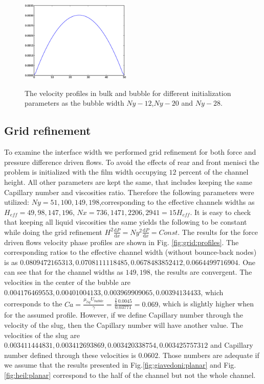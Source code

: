 \documentclass{article}
\begin{document}
\begin{figure}
  \hfill
  \includegraphics[width=0.47\textwidth]{Figures/vel_bulk_force_width_14.eps}\\
  \caption{The velocity profiles in bulk and bubble for different initialization
  parameters as the
  bubble width $Ny-12$,$Ny-20$ and $Ny-28$.
  \label{fig:velocity:profiles:different:widths:force}}
  \end{figure}


\subsection{Grid refinement}
To examine the interface width we performed grid refinement for both force and
pressure difference driven flows. To avoid the effects of rear and front
menisci the problem is initialized with the film width occupying $12$ percent
of the channel height. All other parameters are kept the same, that includes
keeping the same Capillary number and viscosities ratio. Therefore the
following parameters were utilized: $Ny=51,100,149,198$,corresponding to the
effective channels widths as $H_{eff}=49,98,147,196$, $Nx=736,1471,2206,2941=15
H_{eff}$. It is easy to check
that keeping all liquid viscosities the same yields the following to be
constant while doing the grid refinement
$H^2\frac{\mathrm{d}P}{\mathrm{d}x}=Ny^2\frac{\mathrm{d}P}{\mathrm{d}x}=Const$.
The results for the force driven flows velocity phase profiles are shown in
Fig. \ref{fig:grid:profiles}. The corresponding ratios to the effective channel
width (without bounce-back nodes) is as $0.0809472165313,
0.0708111118485, 0.0678483852412, 0.0664499716904$. One can see
that for the channel widths as $149,198$, the results are convergent. The
velocities in the center of the bubble are $0.004176469553,
0.00401004133, 0.003969909065, 0.00394134433$, which corresponds
to the $Ca=\frac{\mu_{liq} U_{bubble}}{\gamma}=\frac{\frac{2}{3}\,
0.0045}{0.03771}=0.069$, which is slightly higher when for the assumed
profile. However, if we define Capillary number through the velocity of the
slug, then the Capillary number will have another value. The velocities of the
slug are $0.003411444831,0.003412693869,0.003420338754,0.003425757312$ and
Capillary number defined through these velocities is $0.0602$. Those numbers
are adequate if we assume that the results presented in
Fig.\ref{fig:giavedoni:planar} and Fig. \ref{fig:heil:planar} correspond to the
half of the channel but not the whole channel. 
\end{document}
